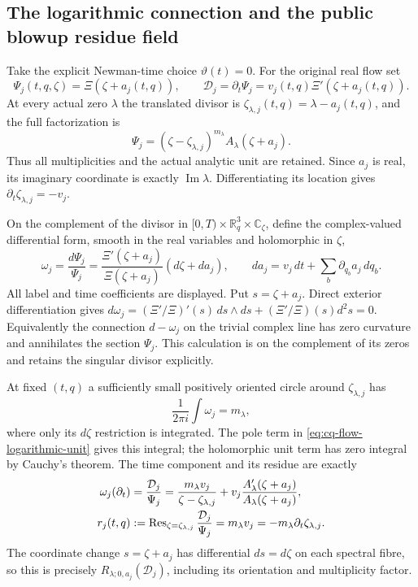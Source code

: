 \subsection{The logarithmic connection and the public blowup residue field}

Take the explicit Newman-time choice $\vartheta(t)=0$.
For the original real flow set
\[
 \Psi_j(t,q,\zeta)=\Xi(\zeta+a_j(t,q)),\qquad
 \mathcal D_j=\partial_t\Psi_j
             =v_j(t,q)\Xi'(\zeta+a_j(t,q)).
\]
At every actual zero $\lambda$ the translated divisor is
$\zeta_{\lambda,j}(t,q)=\lambda-a_j(t,q)$, and the full factorization
is
\[
 \Psi_j=
 (\zeta-\zeta_{\lambda,j})^{m_\lambda}
 A_\lambda(\zeta+a_j).
\]
Thus all multiplicities and the actual analytic unit are retained.
Since $a_j$ is real, its imaginary coordinate is exactly
$\operatorname{Im}\lambda$. Differentiating its location gives
$\partial_t\zeta_{\lambda,j}=-v_j$.

On the complement of the divisor in
$[0,T)\times\mathbb R^3_q\times\mathbb C_\zeta$, define the
complex-valued differential form, smooth in the real variables and
holomorphic in $\zeta$,
\begin{equation}
 \omega_j=\frac{d\Psi_j}{\Psi_j}
 =\frac{\Xi'(\zeta+a_j)}{\Xi(\zeta+a_j)}
                         (d\zeta+da_j),\qquad
 da_j=v_j\,dt+\sum_b\partial_{q_b}a_j\,dq_b .
 \label{eq:cq-flow-logarithmic-connection}
\end{equation}
All label and time coefficients are displayed. Put $s=\zeta+a_j$.
Direct exterior differentiation gives
$d\omega_j=(\Xi'/\Xi)'(s)\,ds\wedge ds+
(\Xi'/\Xi)(s)d^2s=0$.
Equivalently the connection $d-\omega_j$ on the trivial complex
line has zero curvature and annihilates the section $\Psi_j$.
This calculation is on the complement of its zeros and retains
the singular divisor explicitly.

At fixed $(t,q)$ a sufficiently small positively oriented circle
around $\zeta_{\lambda,j}$ has
\[
 \frac1{2\pi i}\int\omega_j=m_\lambda,
\]
where only its $d\zeta$ restriction is integrated. The pole term in
\eqref{eq:cq-flow-logarithmic-unit} gives this integral; the
holomorphic unit term has zero integral by Cauchy's theorem.
The time component and its residue are exactly
\begin{align}
 \omega_j(\partial_t)
 &=\frac{\mathcal D_j}{\Psi_j}
 =\frac{m_\lambda v_j}{\zeta-\zeta_{\lambda,j}}
       +v_j\frac{A_\lambda'(\zeta+a_j)}
                       {A_\lambda(\zeta+a_j)},\notag\\
 r_j(t,q)
 &:=\operatorname{Res}_{\zeta=\zeta_{\lambda,j}}
                    \frac{\mathcal D_j}{\Psi_j}
 =m_\lambda v_j
 =-m_\lambda\partial_t\zeta_{\lambda,j}.
 \label{eq:cq-flow-temporal-residue}
\end{align}
The coordinate change $s=\zeta+a_j$ has differential $ds=d\zeta$
on each spectral fibre, so this is precisely
$R_{\lambda;0,a_j}(\mathcal D_j)$, including its orientation
and multiplicity factor.

